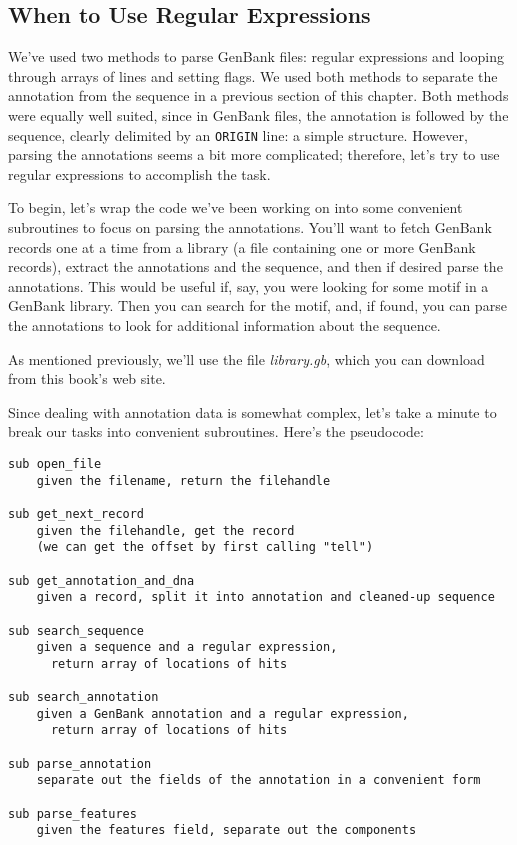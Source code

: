 \subsection{When to Use Regular Expressions}
We've used two methods to parse GenBank files: regular expressions and looping through arrays of lines and setting flags. We used both methods to separate the annotation from the sequence in a previous section of this chapter. Both methods were equally well suited, since in GenBank files, the annotation is followed by the sequence, clearly delimited by an \verb|ORIGIN| line: a simple structure. However, parsing the annotations seems a bit more complicated; therefore, let's try to use regular expressions to accomplish the task.

To begin, let's wrap the code we've been working on into some convenient subroutines to focus on parsing the annotations. You'll want to fetch GenBank records one at a time from a library (a file containing one or more GenBank records), extract the annotations and the sequence, and then if desired parse the annotations. This would be useful if, say, you were looking for some motif in a GenBank library. Then you can search for the motif, and, if found, you can parse the annotations to look for additional information about the sequence.

As mentioned previously, we'll use the file \textit{library.gb}, which you can download from this book's web site.

Since dealing with annotation data is somewhat complex, let's take a minute to break our tasks into convenient subroutines. Here's the pseudocode:

\begin{lstlisting}
sub open_file
    given the filename, return the filehandle

sub get_next_record
    given the filehandle, get the record
    (we can get the offset by first calling "tell")

sub get_annotation_and_dna
    given a record, split it into annotation and cleaned-up sequence

sub search_sequence
    given a sequence and a regular expression,
      return array of locations of hits

sub search_annotation
    given a GenBank annotation and a regular expression,
      return array of locations of hits

sub parse_annotation
    separate out the fields of the annotation in a convenient form

sub parse_features
    given the features field, separate out the components
\end{lstlisting}

